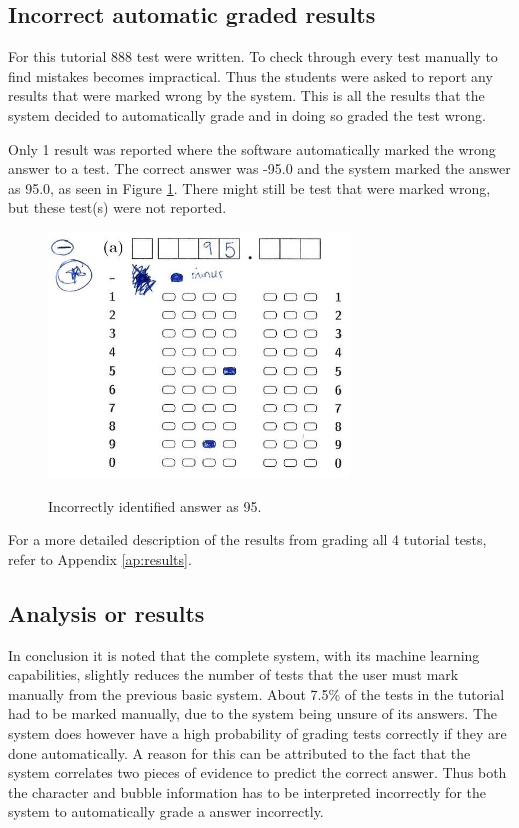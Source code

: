 \subsection{Incorrect automatic graded results}

For this tutorial 888 test were written. To check through every test manually to find mistakes becomes impractical. Thus the students were asked to report any results that were marked wrong by the system. This is all the results that the system decided to automatically grade and in doing so graded the test wrong.

Only 1 result was reported where the software automatically marked the wrong answer to a test. The correct answer was -95.0 and the system marked the answer as 95.0, as seen in Figure \ref{fig:wrongAns}. There might still be test that were marked wrong, but these test(s) were not reported.

\begin{figure}
  \centering
  \includegraphics[width=8cm]{wrongResult}\\
  \caption{Incorrectly identified answer as 95.}
  \label{fig:wrongAns}
\end{figure}

For a more detailed description of the results from grading all 4 tutorial tests, refer to Appendix \ref{ap:results}.

\subsection{Analysis or results}

In conclusion it is noted that the complete system, with its machine learning capabilities, slightly reduces the number of tests that the user must mark manually from the previous basic system. About 7.5\% of the tests in the tutorial had to be marked manually, due to the system being unsure of its answers. The system does however have a high probability of grading tests correctly if they are done automatically. A reason for this can be attributed to the fact that the system correlates two pieces of evidence to predict the correct answer. Thus both the character and bubble information has to be interpreted incorrectly for the system to automatically grade a answer incorrectly. 

